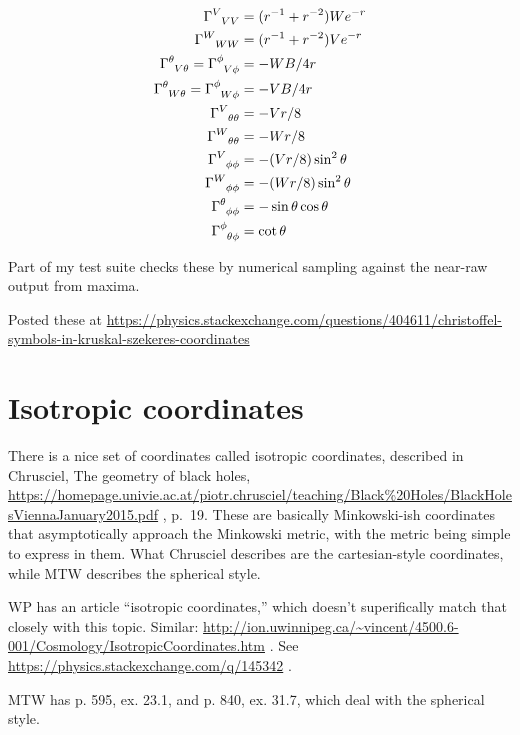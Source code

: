 \documentclass{article}
\begin{document}
\begin{align}
\Gamma\indices{^V_V_V} &= (r^{-1}+r^{-2})We^{-r} \\
\Gamma\indices{^W_W_W} &= (r^{-1}+r^{-2})Ve^{-r} \\
\Gamma\indices{^\theta_V_\theta} = \Gamma\indices{^\phi_V_\phi} &= -WB/4r  \\
\Gamma\indices{^\theta_W_\theta} = \Gamma\indices{^\phi_W_\phi} &= -VB/4r  \\
%
\Gamma\indices{^V_\theta_\theta} &= -Vr/8\\
\Gamma\indices{^W_\theta_\theta} &= -Wr/8\\
\Gamma\indices{^V_\phi_\phi} &= -(Vr/8) \sin^2\theta\\
\Gamma\indices{^W_\phi_\phi} &= -(Wr/8) \sin^2\theta\\
%
\Gamma\indices{^\theta_\phi_\phi} &= -\sin\theta \cos\theta   \\
\Gamma\indices{^\phi_\theta_\phi} &= \cot\theta   
\end{align}

Part of my test suite checks
these by numerical sampling against the near-raw output from maxima.

Posted these at \url{https://physics.stackexchange.com/questions/404611/christoffel-symbols-in-kruskal-szekeres-coordinates}

\section{Isotropic coordinates}

There is a nice set of coordinates called isotropic coordinates,
described in Chrusciel, The geometry of black holes,
\url{https://homepage.univie.ac.at/piotr.chrusciel/teaching/Black%20Holes/BlackHolesViennaJanuary2015.pdf} ,
p.~19. These are basically Minkowski-ish coordinates that asymptotically approach the Minkowski
metric, with the metric being simple to express in them.  What Chrusciel describes are
the cartesian-style coordinates, while MTW describes the spherical style.

WP has an article ``isotropic coordinates,'' which doesn't superifically match that
closely with this topic. 
Similar: \url{http://ion.uwinnipeg.ca/~vincent/4500.6-001/Cosmology/IsotropicCoordinates.htm} .
See \url{https://physics.stackexchange.com/q/145342} .

MTW has p. 595, ex. 23.1, and p. 840, ex. 31.7, which deal with the spherical style.
\end{document}
